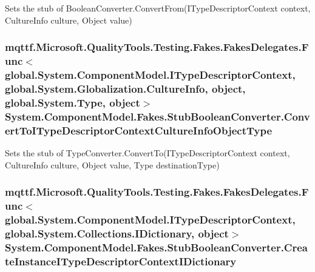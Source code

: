 Sets the stub of Boolean\-Converter.\-Convert\-From(\-I\-Type\-Descriptor\-Context context, Culture\-Info culture, Object value)

\hypertarget{class_system_1_1_component_model_1_1_fakes_1_1_stub_boolean_converter_a296799d7a36b332d6cfb7a3d4e19cf95}{
\subsubsection[{Convert\-To\-I\-Type\-Descriptor\-Context\-Culture\-Info\-Object\-Type}]{\setlength{\rightskip}{0pt plus 5cm}mqttf.\-Microsoft.\-Quality\-Tools.\-Testing.\-Fakes.\-Fakes\-Delegates.\-Func$<$global.\-System.\-Component\-Model.\-I\-Type\-Descriptor\-Context, global.\-System.\-Globalization.\-Culture\-Info, object, global.\-System.\-Type, object$>$ System.\-Component\-Model.\-Fakes.\-Stub\-Boolean\-Converter.\-Convert\-To\-I\-Type\-Descriptor\-Context\-Culture\-Info\-Object\-Type}}\label{class_system_1_1_component_model_1_1_fakes_1_1_stub_boolean_converter_a296799d7a36b332d6cfb7a3d4e19cf95}


Sets the stub of Type\-Converter.\-Convert\-To(\-I\-Type\-Descriptor\-Context context, Culture\-Info culture, Object value, Type destination\-Type)

\hypertarget{class_system_1_1_component_model_1_1_fakes_1_1_stub_boolean_converter_a5dd3a6813be0233580b9f2c19953fdf1}{
\subsubsection[{Create\-Instance\-I\-Type\-Descriptor\-Context\-I\-Dictionary}]{\setlength{\rightskip}{0pt plus 5cm}mqttf.\-Microsoft.\-Quality\-Tools.\-Testing.\-Fakes.\-Fakes\-Delegates.\-Func$<$global.\-System.\-Component\-Model.\-I\-Type\-Descriptor\-Context, global.\-System.\-Collections.\-I\-Dictionary, object$>$ System.\-Component\-Model.\-Fakes.\-Stub\-Boolean\-Converter.\-Create\-Instance\-I\-Type\-Descriptor\-Context\-I\-Dictionary}}\label{class_system_1_1_component_model_1_1_fakes_1_1_stub_boolean_converter_a5dd3a6813be0233580b9f2c19953fdf1}


